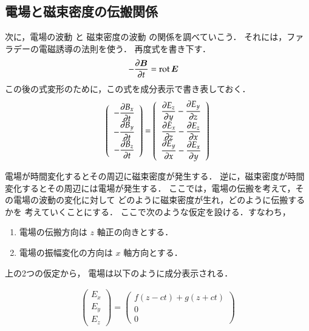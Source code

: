     \subsection{電場と磁束密度の伝搬関係}
        次に，電場の波動 と 磁束密度の波動 の関係を調べていこう．
        それには，ファラデーの電磁誘導の法則を使う．
        再度式を書き下す．
                        \begin{align}
                            -\frac{\partial \boldsymbol{B}}{\partial t}
                            &=\mathrm{rot\,} \boldsymbol{E}
                        \end{align}
        この後の式変形のために，この式を成分表示で書き表しておく．
        \begin{align}\label{dennpann1}
        \left(
        \begin{array}{cc}
        -\displaystyle\frac{\rd B_{x}}{\rd t} \\
        -\displaystyle\frac{\rd B_{y}}{\rd t} \\
        -\displaystyle\frac{\rd B_{z}}{\rd t}
        \end{array}
        \right)
        =
        \left(
            \begin{array}{cc}
            \displaystyle\frac{\rd E_{z}}{\rd y}-\frac{\rd E_{y}}{\rd z}\\
            \displaystyle\frac{\rd E_{x}}{\rd z}-\frac{\rd E_{z}}{\rd x} \\
            \displaystyle\frac{\rd E_{y}}{\rd x}-\frac{\rd E_{x}}{\rd y}
            \end{array}
            \right)
        \end{align}

        電場が時間変化するとその周辺に磁束密度が発生する．
        逆に，磁束密度が時間変化するとその周辺には電場が発生する．
        ここでは，電場の伝搬を考えて，その電場の波動の変化に対して
        どのように磁束密度が生れ，どのように伝搬するかを
        考えていくことにする．
        ここで次のような仮定を設ける．すなわち，

        \begin{enumerate}
        \item 電場の伝搬方向は $z$ 軸正の向きとする．
        \item 電場の振幅変化の方向は $x$ 軸方向とする．
        \end{enumerate}
        上の2つの仮定から，
        電場は以下のように成分表示される．

        \begin{align}\label{dennpann2}
        \left(
        \begin{array}{cc}
        E_{x} \\
        E_{y} \\
        E_{z}
        \end{array}
        \right)
        =
        \left(
        \begin{array}{cc}
        f(z-ct) +g(z+ct)\\
        0 \\
        0
        \end{array}
        \right)
        \end{align}



